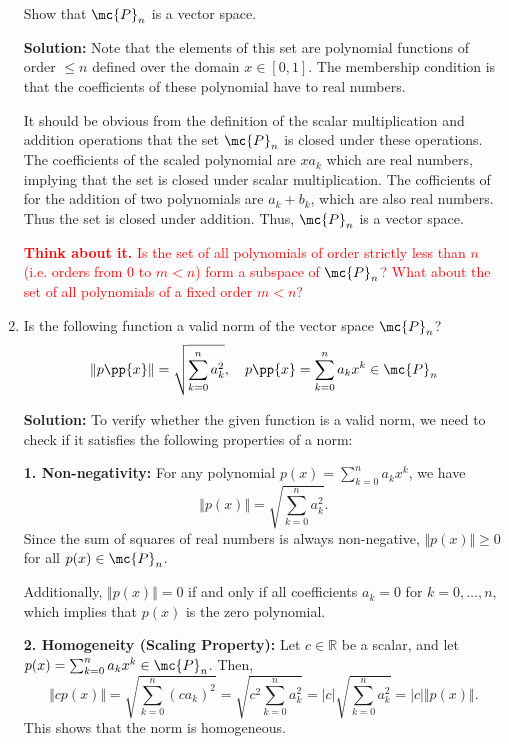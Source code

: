 \begin{enumerate}
    Show that $\mc{P}_n$ is a vector space.

    \begin{boxedstuff}
        \vspace{4mm}
        \textbf{Solution:} Note that the elements of this set are polynomial functions of order $\leq n$ defined over the domain $x \in \left[ 0, 1\right]$. The membership condition is that the coefficients of these polynomial have to real numbers.

        It should be obvious from the definition of the scalar multiplication and addition operations that the set $\mc{P}_n$ is closed under these operations. The coefficients of the scaled polynomial are $x a_k$ which are real numbers, implying that the set is closed under scalar multiplication. The cofficients of for the addition of two polynomials are $a_k + b_k$, which are also real numbers. Thus the set is closed under addition. Thus, $\mc{P}_n$ is a vector space.

        \textcolor{red}{\textbf{Think about it.} Is the set of all polynomials of order strictly less than $n$ (i.e. orders from 0 to $m < n$) form a subspace of $\mc{P}_n$? What about the set of all polynomials of a fixed order $m < n$?} 
    \end{boxedstuff}
    
    \item Is the following function a valid norm of the vector space $\mc{P}_n$?
    \[ \Vert p\pp{x} \Vert = \sqrt{\sum_{k=0}^{n} a_k^2 }, \quad p\pp{x} = \sum_{k=0}^n a_kx^k \in \mc{P}_n \]
    
    \begin{boxedstuff}
        \vspace{4mm}
        \textbf{Solution:} To verify whether the given function is a valid norm, we need to check if it satisfies the following properties of a norm:

        \textbf{1. Non-negativity:} 
        For any polynomial $p(x) = \sum_{k=0}^n a_k x^k$, we have 
        \[
        \Vert p(x) \Vert = \sqrt{\sum_{k=0}^{n} a_k^2}.
        \]
        Since the sum of squares of real numbers is always non-negative, $\Vert p(x) \Vert \geq 0$ for all $p(x) \in \mc{P}_n$. 

        Additionally, $\Vert p(x) \Vert = 0$ if and only if all coefficients $a_k = 0$ for $k = 0, \dots, n$, which implies that $p(x)$ is the zero polynomial.

        \textbf{2. Homogeneity (Scaling Property):} 
        Let $c \in \mathbb{R}$ be a scalar, and let $p(x) = \sum_{k=0}^n a_k x^k \in \mc{P}_n$. Then,
        \[
        \Vert c p(x) \Vert = \sqrt{\sum_{k=0}^{n} (c a_k)^2} = \sqrt{c^2 \sum_{k=0}^{n} a_k^2} = |c| \sqrt{\sum_{k=0}^{n} a_k^2} = |c| \Vert p(x) \Vert.
        \]
        This shows that the norm is homogeneous.


\end{boxedstuff}
\end{enumerate}
